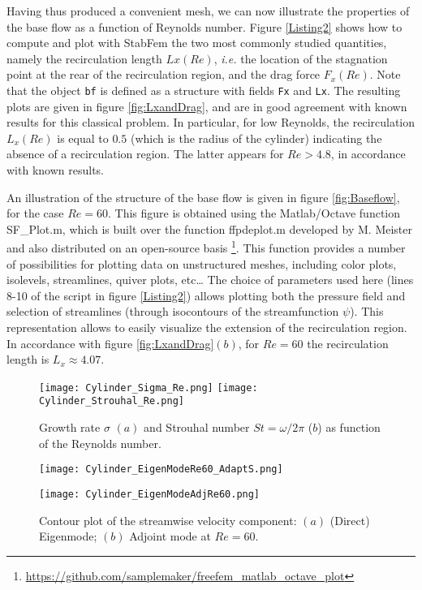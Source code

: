 \documentclass[twocolumn,10pt]{asme2ej}
\begin{document}
Having thus produced a convenient mesh, we can now illustrate the properties of the base flow as a function of Reynolds number. Figure \ref{Listing2} shows how to compute and plot with StabFem the two most commonly studied quantities, namely the recirculation length $Lx(Re)$, \textit{i.e.} the location of the stagnation point at the rear of the recirculation region, and the drag force $F_x(Re)$.
Note that the object \verb|bf| is defined as a structure with fields \verb|Fx| and \verb|Lx|. 
The resulting plots are given in figure \ref{fig:LxandDrag}, and are in good agreement with known results for this classical problem.
In particular, for low Reynolds, the recirculation $L_x(Re)$ is equal to $0.5$ (which is the radius of the cylinder) indicating the absence of a recirculation region. The latter appears for $Re > 4.8$, in accordance with known results.

An illustration of the structure of the base flow is given in figure \ref{fig:Baseflow},  for the case $Re = 60$. This figure is obtained using the Matlab/Octave function {\sf  SF\_Plot.m}, which is built over the function {\sf  ffpdeplot.m} developed by M. Meister and also distributed on an open-source basis
\footnote{\url{https://github.com/samplemaker/freefem\_matlab\_octave\_plot}}.  
This function provides a number of possibilities for plotting data on unstructured meshes, including color plots, isolevels, streamlines, quiver plots, etc\ldots
The choice of parameters used here (lines 8-10 of the script in figure \ref{Listing2})  allows plotting both the pressure field and selection of streamlines (through isocontours of the streamfunction $\psi$). This representation allows to easily visualize the extension of the recirculation region. In accordance with figure \ref{fig:LxandDrag}$(b)$, for $Re = 60$ the recirculation length is $L_x \approx 4.07$.





\begin{figure}
\texttt{[image: Cylinder\_Sigma\_Re.png]}
\texttt{[image: Cylinder\_Strouhal\_Re.png]}
\caption{Growth rate $\sigma$ $(a)$  and Strouhal number $St = \omega/2\pi$ ($b$) as function of the Reynolds number.}
\label{fig:SigmaOmega}
\end{figure}

\begin{figure}
\texttt{[image: Cylinder\_EigenModeRe60\_AdaptS.png]}%

\texttt{[image: Cylinder\_EigenModeAdjRe60.png]}
\caption{Contour plot of the streamwise velocity component: $(a)$ (Direct) Eigenmode; $(b)$ Adjoint mode at $Re= 60$.}
\label{fig:Eigenmode}
\end{figure}
\end{document}
